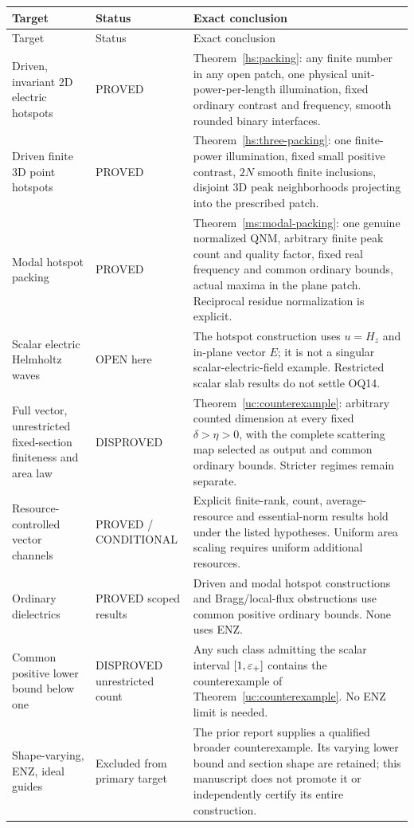 \begin{longtable}{@{}p{}p{}p{}@{}}
\toprule Target & Status & Exact conclusion\\\midrule\endfirsthead
\toprule Target & Status & Exact conclusion\\\midrule\endhead
Driven, invariant 2D electric hotspots & PROVED & Theorem~\ref{hs:packing}: any finite number in any open patch, one physical unit-power-per-length illumination, fixed ordinary contrast and frequency, smooth rounded binary interfaces.\\[3pt]
Driven finite 3D point hotspots & PROVED & Theorem~\ref{hs:three-packing}: one finite-power illumination, fixed small positive contrast, $2N$ smooth finite inclusions, disjoint 3D peak neighborhoods projecting into the prescribed patch.\\[3pt]
Modal hotspot packing & PROVED & Theorem~\ref{ms:modal-packing}: one genuine normalized QNM, arbitrary finite peak count and quality factor, fixed real frequency and common ordinary bounds, actual maxima in the plane patch. Reciprocal residue normalization is explicit.\\[3pt]
Scalar electric Helmholtz waves & OPEN here & The hotspot construction uses $u=H_z$ and in-plane vector $E$; it is not a singular scalar-electric-field example. Restricted scalar slab results do not settle OQ14.\\[3pt]
Full vector, unrestricted fixed-section finiteness and area law & DISPROVED & Theorem~\ref{uc:counterexample}: arbitrary counted dimension at every fixed $\delta>\eta>0$, with the complete scattering map selected as output and common ordinary bounds. Stricter regimes remain separate.\\[3pt]
Resource-controlled vector channels & PROVED / CONDITIONAL & Explicit finite-rank, count, average-resource and essential-norm results hold under the listed hypotheses. Uniform area scaling requires uniform additional resources.\\[3pt]
Ordinary dielectrics & PROVED scoped results & Driven and modal hotspot constructions and Bragg/local-flux obstructions use common positive ordinary bounds. None uses ENZ.\\[3pt]
Common positive lower bound below one & DISPROVED unrestricted count & Any such class admitting the scalar interval $[1,\varepsilon_+]$ contains the counterexample of Theorem~\ref{uc:counterexample}. No ENZ limit is needed.\\[3pt]
Shape-varying, ENZ, ideal guides & Excluded from primary target & The prior report supplies a qualified broader counterexample. Its varying lower bound and section shape are retained; this manuscript does not promote it or independently certify its entire construction.\\[3pt]

\end{longtable}
